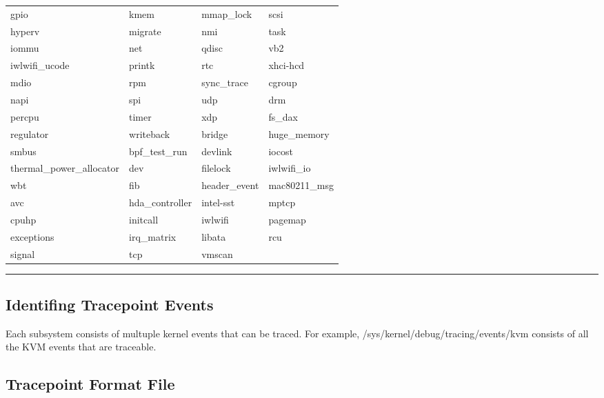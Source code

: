 \documentclass{report}
\begin{document}
\begin{spacing}{1.5}
{\begin{longtable}{llll}
gpio                        & kmem             & mmap\_lock        & scsi \\
hyperv                      & migrate          & nmi              & task \\
iommu                       & net              & qdisc            & vb2 \\
iwlwifi\_ucode               & printk           & rtc              & xhci-hcd \\
mdio                        & rpm              & sync\_trace       & cgroup \\
napi                        & spi              & udp              & drm \\
percpu                      & timer            & xdp              & fs\_dax \\
regulator                   & writeback        & bridge           & huge\_memory \\
smbus                       & bpf\_test\_run     & devlink          & iocost \\
thermal\_power\_allocator     & dev              & filelock         & iwlwifi\_io \\ 
wbt                         & fib              & header\_event     & mac80211\_msg \\
avc                         & hda\_controller   & intel-sst        & mptcp \\
cpuhp                       & initcall         & iwlwifi          & pagemap \\
exceptions                  & irq\_matrix       & libata           & rcu \\
signal                      & tcp              & vmscan \\
\end{longtable}
\noindent\rule{15.5cm}{0.4pt}
\leavevmode\newline
}

\subsection{Identifing Tracepoint Events}

{\large
Each subsystem consists of multuple kernel events that can be traced. For example, /sys/kernel/debug/tracing/events/kvm consists of all the KVM events that are traceable.
\newline
}

\subsection{Tracepoint Format File}


\end{spacing}
\end{document}
